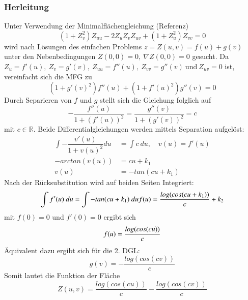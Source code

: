 \begin{refsection}
\subsubsection{Herleitung}\label{Scherk Herleitung}
Unter Verwendung der Minimalflächengleichung (Referenz)
\begin{equation}\label{Minimalflaechengleichung}
(1+ Z_v^{2})Z_{uu} - 2 Z_u Z_v Z_{uv} + (1+ Z_u^{2}) Z_{vv}=0
\end{equation}
wird nach Lösungen des einfachen Problems $z=Z(u,v)=f(u)+g(v)$ unter den Nebenbedingungen $Z(0,0)=0,\ \nabla Z(0,0)=0$ gesucht. 
Da $ Z_u = f'(u),\ Z_v = g'(v),\ Z_{uu}=f''(u),\ Z_{vv} = g''(v) \ \text{und} \ Z_{uv}=0$ ist, vereinfacht sich die MFG zu 
\begin{equation}\label{MFG Scherk}
(1+g'(v)^2)f''(u)+(1+f'(u)^2)g''(v)=0
\end{equation}
Durch Separieren von $f$ und $g$ stellt sich die Gleichung folglich auf
\begin{equation}\label{MFG Scherk2}
-\dfrac{f''(u)}{1+(f'(u))^2}=\dfrac{g''(v)}{1+(g'(v))^2}=c
\end{equation}
mit $c \in \mathbb{R}$.
Beide Differentialgleichungen werden mittels Separation aufgelöst:
\begin{equation}\label{ScherkDGL1}
\begin{split}
\int -\dfrac{v'(u)}{1+v(u)^2} du &= \int c \ du , \quad v(u)=f'(u) \\
-arctan(v(u)) &= cu+k_1 \\
v(u) &= -tan(cu+k_1)
\end{split}
\end{equation}
Nach der Rücksubstitution wird auf beiden Seiten Integriert:
\begin{equation}\label{SchreckDGL2}
\int f'(u)\ du = \int -tan(cu+k_1)\ du\\
f(u) = \dfrac{log(cos(cu+k_1))}{c}+k_2\\
\end{equation}
mit $f(0)=0$ und $f'(0)=0$ ergibt sich
\begin{equation}
f(u) = \dfrac{log(cos(cu))}{c}\\
\end{equation}
Äquivalent dazu ergibt sich für die 2. DGL:
\begin{equation}
g(v) = - \dfrac{log(cos(cv))}{c}
\end{equation}
Somit lautet die Funktion der Fläche
\begin{equation}
Z(u,v)=\dfrac{log(cos(cu))}{c}-\dfrac{log(cos(cv))}{c}
\end{equation}


\end{refsection}
